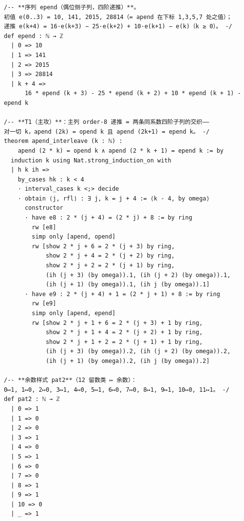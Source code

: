 \documentclass[11pt]{article}
\theoremstyle{definition}
\begin{document}
\begin{lstlisting}
/-- **序列 epend（偶位侧子列，四阶递推）**。
初值 e(0..3) = 10, 141, 2015, 28814（= apend 在下标 1,3,5,7 处之值）；
递推 e(k+4) = 16·e(k+3) − 25·e(k+2) + 10·e(k+1) − e(k)（k ≥ 0）。 -/
def epend : ℕ → ℤ
  | 0 => 10
  | 1 => 141
  | 2 => 2015
  | 3 => 28814
  | k + 4 =>
      16 * epend (k + 3) - 25 * epend (k + 2) + 10 * epend (k + 1) - epend k

/-- **T1（主攻）**：主列 order-8 递推 = 两条同系数四阶子列的交织——
对一切 k，apend (2k) = opend k 且 apend (2k+1) = epend k。 -/
theorem apend_interleave (k : ℕ) :
    apend (2 * k) = opend k ∧ apend (2 * k + 1) = epend k := by
  induction k using Nat.strong_induction_on with
  | h k ih =>
    by_cases hk : k < 4
    · interval_cases k <;> decide
    · obtain ⟨j, rfl⟩ : ∃ j, k = j + 4 := ⟨k - 4, by omega⟩
      constructor
      · have e8 : 2 * (j + 4) = (2 * j) + 8 := by ring
        rw [e8]
        simp only [apend, opend]
        rw [show 2 * j + 6 = 2 * (j + 3) by ring,
            show 2 * j + 4 = 2 * (j + 2) by ring,
            show 2 * j + 2 = 2 * (j + 1) by ring,
            (ih (j + 3) (by omega)).1, (ih (j + 2) (by omega)).1,
            (ih (j + 1) (by omega)).1, (ih j (by omega)).1]
      · have e9 : 2 * (j + 4) + 1 = (2 * j + 1) + 8 := by ring
        rw [e9]
        simp only [apend, epend]
        rw [show 2 * j + 1 + 6 = 2 * (j + 3) + 1 by ring,
            show 2 * j + 1 + 4 = 2 * (j + 2) + 1 by ring,
            show 2 * j + 1 + 2 = 2 * (j + 1) + 1 by ring,
            (ih (j + 3) (by omega)).2, (ih (j + 2) (by omega)).2,
            (ih (j + 1) (by omega)).2, (ih j (by omega)).2]

/-- **余数样式 pat2**（12 留数类 ↦ 余数）：
0↦1, 1↦0, 2↦0, 3↦1, 4↦0, 5↦1, 6↦0, 7↦0, 8↦1, 9↦1, 10↦0, 11↦1。 -/
def pat2 : ℕ → ℤ
  | 0 => 1
  | 1 => 0
  | 2 => 0
  | 3 => 1
  | 4 => 0
  | 5 => 1
  | 6 => 0
  | 7 => 0
  | 8 => 1
  | 9 => 1
  | 10 => 0
  | _ => 1


\end{lstlisting}
\end{document}
